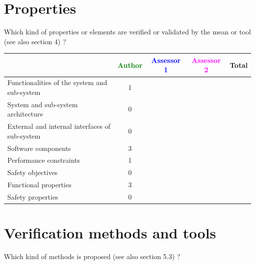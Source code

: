 \section{Properties}

Which kind of properties or elements are verified or validated by the mean or tool (see also \citep{D4.1} section 4)  ?



\begin{tabular}{|l | c | c | c | c|}
\hline
& \textcolor{green}{Author} & \textcolor{blue}{Assessor 1} & \textcolor{magenta}{Assessor 2} & Total \\
\hline 
Functionalities of the system and sub-system & 1 & & &  \\
\hline
System and sub-system architecture & 0 & & &  \\
\hline
External and internal interfaces of sub-system & 0 & & &  \\
\hline
Software components & 3 & & &  \\
\hline
Performance constraints & 1 & & &  \\
\hline
Safety objectives & 0 & & &  \\
\hline
Functional properties & 3 & & &  \\
\hline
Safety properties & 0 & & &  \\
\hline
\end{tabular}



\section{Verification methods and tools}

Which kind of methods is proposed (see also \citep{D4.1} section 5.3) ?



